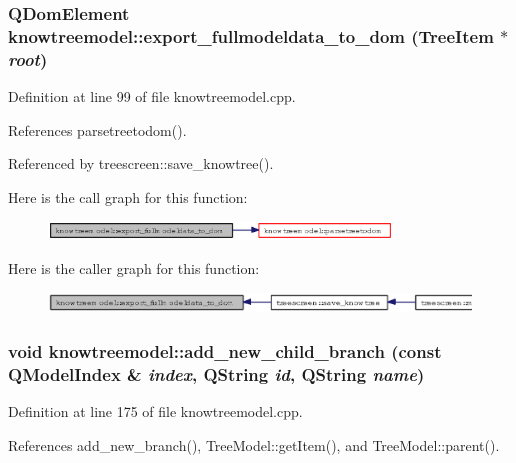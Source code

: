 \subsubsection{\setlength{\rightskip}{0pt plus 5cm}QDom\-Element knowtreemodel::export\_\-fullmodeldata\_\-to\_\-dom ({\bf Tree\-Item} $\ast$ {\em root})}\label{classknowtreemodel_a1a1e8307a9a1d6de4432ae8bf28a42d}




Definition at line 99 of file knowtreemodel.cpp.

References parsetreetodom().

Referenced by treescreen::save\_\-knowtree().

Here is the call graph for this function:\begin{figure}[H]
\begin{center}
\leavevmode
\includegraphics[width=259pt]{classknowtreemodel_a1a1e8307a9a1d6de4432ae8bf28a42d_cgraph}
\end{center}
\end{figure}


Here is the caller graph for this function:\begin{figure}[H]
\begin{center}
\leavevmode
\includegraphics[width=351pt]{classknowtreemodel_a1a1e8307a9a1d6de4432ae8bf28a42d_icgraph}
\end{center}
\end{figure}
\subsubsection{\setlength{\rightskip}{0pt plus 5cm}void knowtreemodel::add\_\-new\_\-child\_\-branch (const QModel\-Index \& {\em index}, QString {\em id}, QString {\em name})}\label{classknowtreemodel_9a5cf7df4f0e7a1362e1eaa725b7826b}




Definition at line 175 of file knowtreemodel.cpp.

References add\_\-new\_\-branch(), Tree\-Model::get\-Item(), and Tree\-Model::parent().

